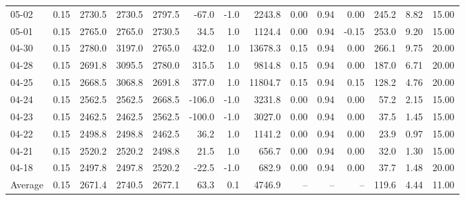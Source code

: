 \begin{threeparttable}
{\begin{tabular}{lrrrrrrrrrrrrr}
  05-02 &     0.15 & 2730.5 & 2730.5 & 2797.5 &      -67.0 &                     -1.0 &              2243.8 &       0.00 &      0.94 &           0.00 &            245.2 &            8.82 &                  15.00 \\
  05-01 &     0.15 & 2765.0 & 2765.0 & 2730.5 &       34.5 &                      1.0 &              1124.4 &       0.00 &      0.94 &          -0.15 &            253.0 &            9.20 &                  15.00 \\
  04-30 &     0.15 & 2780.0 & 3197.0 & 2765.0 &      432.0 &                      1.0 &             13678.3 &       0.15 &      0.94 &           0.00 &            266.1 &            9.75 &                  20.00 \\
  04-28 &     0.15 & 2691.8 & 3095.5 & 2780.0 &      315.5 &                      1.0 &              9814.8 &       0.15 &      0.94 &           0.00 &            187.0 &            6.71 &                  20.00 \\
  04-25 &     0.15 & 2668.5 & 3068.8 & 2691.8 &      377.0 &                      1.0 &             11804.7 &       0.15 &      0.94 &           0.15 &            128.2 &            4.76 &                  20.00 \\
  04-24 &     0.15 & 2562.5 & 2562.5 & 2668.5 &     -106.0 &                     -1.0 &              3231.8 &       0.00 &      0.94 &           0.00 &             57.2 &            2.15 &                  15.00 \\
  04-23 &     0.15 & 2462.5 & 2462.5 & 2562.5 &     -100.0 &                     -1.0 &              3027.0 &       0.00 &      0.94 &           0.00 &             37.5 &            1.45 &                  15.00 \\
  04-22 &     0.15 & 2498.8 & 2498.8 & 2462.5 &       36.2 &                      1.0 &              1141.2 &       0.00 &      0.94 &           0.00 &             23.9 &            0.97 &                  15.00 \\
  04-21 &     0.15 & 2520.2 & 2520.2 & 2498.8 &       21.5 &                      1.0 &               656.7 &       0.00 &      0.94 &           0.00 &             32.0 &            1.30 &                  15.00 \\
  04-18 &     0.15 & 2497.8 & 2497.8 & 2520.2 &      -22.5 &                     -1.0 &               682.9 &       0.00 &      0.94 &           0.00 &             37.7 &            1.48 &                  20.00 \\
Average &     0.15 & 2671.4 & 2740.5 & 2677.1 &       63.3 &                      0.1 &              4746.9 &         -- &        -- &             -- &            119.6 &            4.44 &                  11.00 \\

\end{tabular}}
\end{threeparttable}
